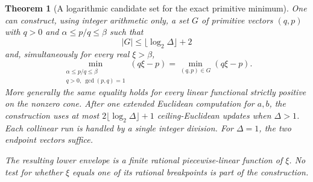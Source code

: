 \documentclass[11pt,a4paper]{article}
\newtheorem{theorem}{Theorem}[section]
\theoremstyle{definition}
\theoremstyle{remark}
\begin{document}
\begin{theorem}[A logarithmic candidate set for the exact primitive minimum]
\label{stage3-farey-logarithmic-sail}
One can construct, using integer arithmetic only, a set $G$ of primitive
vectors $(q,p)$ with $q>0$ and $\alpha\le p/q\le\beta$ such that
\[
 |G|\le\lfloor\log_2\Delta\rfloor+2
\]
and, simultaneously for every real $\xi>\beta$,
\begin{equation}\label{stage3-farey-sail-minimum}
 \min_{\substack{\alpha\le p/q\le\beta\\q>0,\ \gcd(p,q)=1}}
       (q\xi-p)
 =
 \min_{(q,p)\in G}(q\xi-p).
\end{equation}
More generally the same equality holds for every linear functional
strictly positive on the nonzero cone.
After one extended Euclidean computation for $a,b$, the construction uses
at most $2\lfloor\log_2\Delta\rfloor+1$ ceiling-Euclidean updates when
$\Delta>1$. Each collinear run is handled by a single integer division.
For $\Delta=1$, the two endpoint vectors suffice.

The resulting lower envelope is a finite rational piecewise-linear
function of $\xi$. No test for whether $\xi$ equals one of its rational
breakpoints is part of the construction.
\end{theorem}
\end{document}
